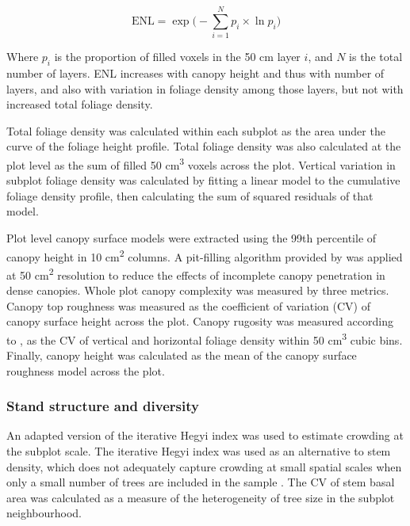 \begin{refsection}
\begin{equation}
	\text{ENL} = \exp\Big(-\sum_{i=1}^{N} p_{i} \times \ln p_{i} \Big)
\end{equation}

Where $p_{i}$ is the proportion of filled voxels in the 50 cm layer $i$, and $N$ is the total number of layers. ENL increases with canopy height and thus with number of layers, and also with variation in foliage density among those layers, but not with increased total foliage density.

Total foliage density was calculated within each subplot as the area under the curve of the foliage height profile. Total foliage density was also calculated at the plot level as the sum of filled 50 cm\textsuperscript{3} voxels across the plot. Vertical variation in subplot foliage density was calculated by fitting a linear model to the cumulative foliage density profile, then calculating the sum of squared residuals of that model. 

Plot level canopy surface models were extracted using the 99th percentile of canopy height in 10 cm\textsuperscript{2} columns. A pit-filling algorithm provided by \citet{Khosravipour2014} was applied at 50 cm\textsuperscript{2} resolution to reduce the effects of incomplete canopy penetration in dense canopies. Whole plot canopy complexity was measured by three metrics. Canopy top roughness was measured as the coefficient of variation (CV) of canopy surface height across the plot. Canopy rugosity was measured according to \citet{Hardiman2011}, as the CV of vertical and horizontal foliage density within 50 cm\textsuperscript{3} cubic bins. Finally, canopy height was calculated as the mean of the canopy surface roughness model across the plot.

\subsubsection{Stand structure and diversity}
\label{tls:sssec:structure_metrics}

An adapted version of the iterative Hegyi index was used to estimate crowding at the subplot scale. The iterative Hegyi index was used as an alternative to stem density, which does not adequately capture crowding at small spatial scales when only a small number of trees are included in the sample \citep{Hegyi1974}. The CV of stem basal area was calculated as a measure of the heterogeneity of tree size in the subplot neighbourhood. 


\end{refsection}
